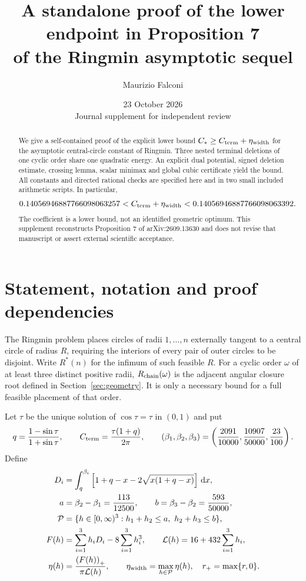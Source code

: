 \documentclass[11pt,a4paper]{article}
\title{A standalone proof of the lower endpoint in Proposition 7\\
of the Ringmin asymptotic sequel}
\author{Maurizio Falconi}
\date{23 October 2026\\Journal supplement for independent review}
\theoremstyle{remark}\newtheorem{remark}[theorem]{Remark}
\newcommand{\Rstar}{R^*}
\newcommand{\Cterm}{C_{\rm term}}
\newcommand{\etaw}{\eta_{\rm width}}
\newcommand{\Rc}{R_{\rm chain}}
\newcommand{\dd}{\,\mathrm d}
\newcommand{\pos}[1]{\left(#1\right)_+}
\begin{document}
\maketitle
\begin{abstract}
We give a self-contained proof of the explicit lower bound
$C_*\ge\Cterm+\etaw$ for the asymptotic central-circle constant of
Ringmin. Three nested terminal deletions of one cyclic order share one
quadratic energy. An explicit dual potential, signed deletion estimate,
crossing lemma, scalar minimax and global cubic certificate yield the bound.
All constants and directed rational checks are specified here and in two
small included arithmetic scripts. In particular,
\[
0.14056946887766098063257<\Cterm+\etaw
<0.14056946887766098063392.
\]
The coefficient is a lower bound, not an identified geometric optimum.
This supplement reconstructs Proposition 7 of arXiv:2609.13630 and does
not revise that manuscript or assert external scientific acceptance.
\end{abstract}
{\small\tableofcontents}
\clearpage

\section{Statement, notation and proof dependencies}\label{sec:statement}
The Ringmin problem places circles of radii $1,\ldots,n$ externally
tangent to a central circle of radius $R$, requiring the interiors of
every pair of outer circles to be disjoint. Write $\Rstar(n)$ for the
infimum of such feasible $R$. For a cyclic order $\omega$ of at least
three distinct positive radii, $\Rc(\omega)$ is the adjacent angular
closure root defined in Section~\ref{sec:geometry}. It is only a necessary
bound for a full feasible placement of that order.

Let $\tau$ be the unique solution of $\cos\tau=\tau$ in $(0,1)$ and put
\begin{equation}\label{eq:parameters}
q=\frac{1-\sin\tau}{1+\sin\tau},\qquad
\Cterm=\frac{\tau(1+q)}{2\pi},\qquad
(\beta_1,\beta_2,\beta_3)=
\left(\frac{2091}{10000},\frac{10907}{50000},\frac{23}{100}\right).
\end{equation}
Define
\begin{align}
D_i&=\int_q^{\beta_i}\left[1+q-x-2\sqrt{x(1+q-x)}\right]\dd x,
\label{eq:Di}\\
a&=\beta_2-\beta_1=\frac{113}{12500},\qquad
b=\beta_3-\beta_2=\frac{593}{50000},\nonumber\\
\mathcal P&=\{h\in[0,\infty)^3:h_1+h_2\le a,\ h_2+h_3\le b\},\nonumber\\
F(h)&=\sum_{i=1}^3h_iD_i-8\sum_{i=1}^3h_i^3,\qquad
\mathcal L(h)=16+432\sum_{i=1}^3h_i,\label{eq:objective}\\
\eta(h)&=\frac{\pos{F(h)}}{\pi\mathcal L(h)},\qquad
\etaw=\max_{h\in\mathcal P}\eta(h),\quad r_+=\max\{r,0\}.\nonumber
\end{align}
\end{document}
